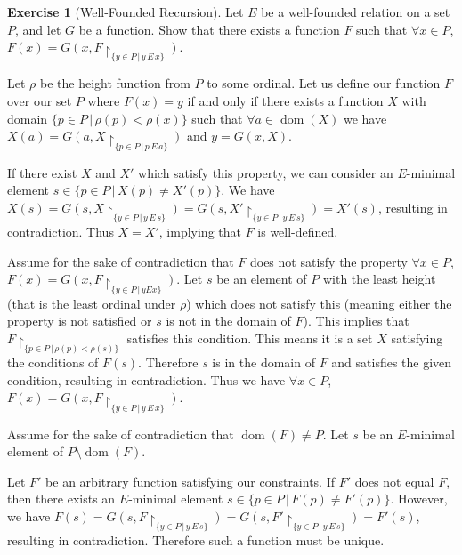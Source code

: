 \documentclass{article}
\theoremstyle{definition}
\newtheorem{exer}{Exercise}[section]
\DeclareMathOperator{\dom}{dom}
\newlength{\defparindent}
\newenvironment{answer}
    {\begin{mdframed}[backgroundcolor=gray!15, linewidth=0pt] \setlength{\parindent}{\defparindent}}
    {\end{mdframed}}
\begin{document}
\begin{exer}[Well-Founded Recursion]
    Let $E$ be a well-founded relation on a set $P$, and let $G$ be a function. Show that there exists a function $F$ such that $\forall x \in P$, $F(x) = G(x, F\restriction_{\{y \in P \, | \, y \, E \, x\}})$.
    \begin{answer}
        Let $\rho$ be the height function from $P$ to some ordinal. Let us define our function $F$ over our set $P$ where $F(x) = y$ if and only if there exists a function $X$ with domain $\{p \in P \, | \, \rho(p) < \rho(x)\}$ such that $\forall a \in \dom(X)$ we have $X(a) = G(a, X \restriction_{\{p \in P \, | \, p \, E \, a\}})$ and $y = G(x, X)$.

        If there exist $X$ and $X'$ which satisfy this property, we can consider an $E$-minimal element $s \in \{p \in P \, | \, X(p) \ne X'(p)\}$. We have $X(s) = G(s, X\restriction_{\{y \in P \, | \, y \, E \, s\}}) = G(s, X'\restriction_{\{y \in P \, | \, y \, E \, s\}}) = X'(s)$, resulting in contradiction. Thus $X = X'$, implying that $F$ is well-defined. 

        Assume for the sake of contradiction that $F$ does not satisfy the property $\forall x \in P$, $F(x) = G(x, F \restriction_{\{y \in P \, | \, y E x\}})$. Let $s$ be an element of $P$ with the least height (that is the least ordinal under $\rho$) which does not satisfy this (meaning either the property is not satisfied or $s$ is not in the domain of $F$). This implies that $F\restriction_{\{p \in P \, | \, \rho(p) < \rho(s)\}}$ satisfies this condition. This means it is a set $X$ satisfying the conditions of $F(s)$. Therefore $s$ is in the domain of $F$ and satisfies the given condition, resulting in contradiction. Thus we have $\forall x \in P$, $F(x) = G(x, F\restriction_{\{y \in P \, | \, y \, E \, x\}})$. 

        Assume for the sake of contradiction that $\dom(F) \ne P$. Let $s$ be an  $E$-minimal element of $P \setminus \dom(F)$.
        
        Let $F'$ be an arbitrary function satisfying our constraints. If $F'$ does not equal $F$, then there exists an $E$-minimal element $s \in \{p \in P \, | \, F(p) \ne F'(p)\}$. However, we have $F(s) = G(s, F\restriction_{\{y \in P \, | \, y \, E \, s\}}) = G(s, F'\restriction_{\{y \in P \, | \, y \, E \, s\}}) = F'(s)$, resulting in contradiction. Therefore such a function must be unique.
    \end{answer}
\end{exer}
\end{document}
